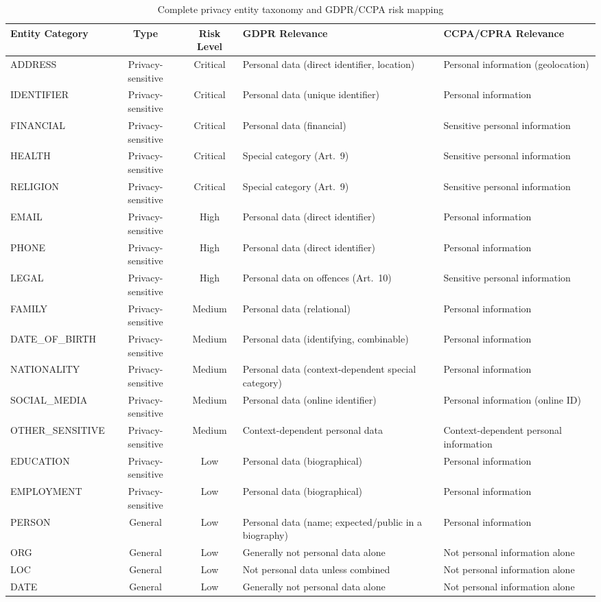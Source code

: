 \documentclass[conference]{IEEEtran}
\begin{document}
\begin{table}[!ht]
\centering
\caption{Complete privacy entity taxonomy and GDPR/CCPA risk mapping}
\label{tab:taxonomy}
\begin{tabular}{lccll}
\toprule
Entity Category & Type & Risk Level & GDPR Relevance & CCPA/CPRA Relevance \\
\midrule
ADDRESS & Privacy-sensitive & Critical & Personal data (direct identifier, location) & Personal information (geolocation) \\
IDENTIFIER & Privacy-sensitive & Critical & Personal data (unique identifier) & Personal information \\
FINANCIAL & Privacy-sensitive & Critical & Personal data (financial) & Sensitive personal information \\
HEALTH & Privacy-sensitive & Critical & Special category (Art.~9) & Sensitive personal information \\
RELIGION & Privacy-sensitive & Critical & Special category (Art.~9) & Sensitive personal information \\
EMAIL & Privacy-sensitive & High & Personal data (direct identifier) & Personal information \\
PHONE & Privacy-sensitive & High & Personal data (direct identifier) & Personal information \\
LEGAL & Privacy-sensitive & High & Personal data on offences (Art.~10) & Sensitive personal information \\
FAMILY & Privacy-sensitive & Medium & Personal data (relational) & Personal information \\
DATE\_OF\_BIRTH & Privacy-sensitive & Medium & Personal data (identifying, combinable) & Personal information \\
NATIONALITY & Privacy-sensitive & Medium & Personal data (context-dependent special category) & Personal information \\
SOCIAL\_MEDIA & Privacy-sensitive & Medium & Personal data (online identifier) & Personal information (online ID) \\
OTHER\_SENSITIVE & Privacy-sensitive & Medium & Context-dependent personal data & Context-dependent personal information \\
EDUCATION & Privacy-sensitive & Low & Personal data (biographical) & Personal information \\
EMPLOYMENT & Privacy-sensitive & Low & Personal data (biographical) & Personal information \\
PERSON & General & Low & Personal data (name; expected/public in a biography) & Personal information \\
ORG & General & Low & Generally not personal data alone & Not personal information alone \\
LOC & General & Low & Not personal data unless combined & Not personal information alone \\
DATE & General & Low & Generally not personal data alone & Not personal information alone \\
\bottomrule
\end{tabular}
\end{table}
\end{document}
